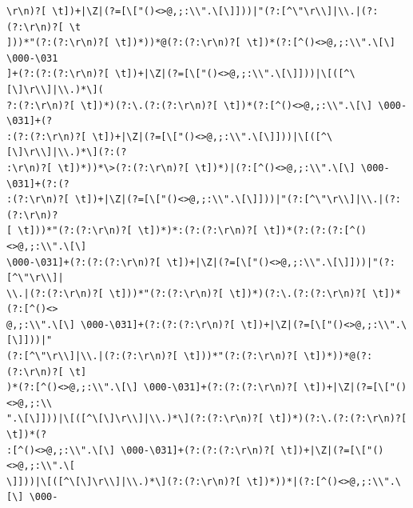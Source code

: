 \documentclass{beamer}
\begin{document}
\begin{frame}[fragile]
\begingroup
 \fontsize{6pt}{8pt}\selectfont
\begin{verbatim}
\r\n)?[ \t])+|\Z|(?=[\["()<>@,;:\\".\[\]]))|"(?:[^\"\r\\]|\\.|(?:(?:\r\n)?[ \t
]))*"(?:(?:\r\n)?[ \t])*))*@(?:(?:\r\n)?[ \t])*(?:[^()<>@,;:\\".\[\] \000-\031
]+(?:(?:(?:\r\n)?[ \t])+|\Z|(?=[\["()<>@,;:\\".\[\]]))|\[([^\[\]\r\\]|\\.)*\](
?:(?:\r\n)?[ \t])*)(?:\.(?:(?:\r\n)?[ \t])*(?:[^()<>@,;:\\".\[\] \000-\031]+(?
:(?:(?:\r\n)?[ \t])+|\Z|(?=[\["()<>@,;:\\".\[\]]))|\[([^\[\]\r\\]|\\.)*\](?:(?
:\r\n)?[ \t])*))*\>(?:(?:\r\n)?[ \t])*)|(?:[^()<>@,;:\\".\[\] \000-\031]+(?:(?
:(?:\r\n)?[ \t])+|\Z|(?=[\["()<>@,;:\\".\[\]]))|"(?:[^\"\r\\]|\\.|(?:(?:\r\n)?
[ \t]))*"(?:(?:\r\n)?[ \t])*)*:(?:(?:\r\n)?[ \t])*(?:(?:(?:[^()<>@,;:\\".\[\] 
\000-\031]+(?:(?:(?:\r\n)?[ \t])+|\Z|(?=[\["()<>@,;:\\".\[\]]))|"(?:[^\"\r\\]|
\\.|(?:(?:\r\n)?[ \t]))*"(?:(?:\r\n)?[ \t])*)(?:\.(?:(?:\r\n)?[ \t])*(?:[^()<>
@,;:\\".\[\] \000-\031]+(?:(?:(?:\r\n)?[ \t])+|\Z|(?=[\["()<>@,;:\\".\[\]]))|"
(?:[^\"\r\\]|\\.|(?:(?:\r\n)?[ \t]))*"(?:(?:\r\n)?[ \t])*))*@(?:(?:\r\n)?[ \t]
)*(?:[^()<>@,;:\\".\[\] \000-\031]+(?:(?:(?:\r\n)?[ \t])+|\Z|(?=[\["()<>@,;:\\
".\[\]]))|\[([^\[\]\r\\]|\\.)*\](?:(?:\r\n)?[ \t])*)(?:\.(?:(?:\r\n)?[ \t])*(?
:[^()<>@,;:\\".\[\] \000-\031]+(?:(?:(?:\r\n)?[ \t])+|\Z|(?=[\["()<>@,;:\\".\[
\]]))|\[([^\[\]\r\\]|\\.)*\](?:(?:\r\n)?[ \t])*))*|(?:[^()<>@,;:\\".\[\] \000-

\end{verbatim}
\end{frame}
\end{document}
